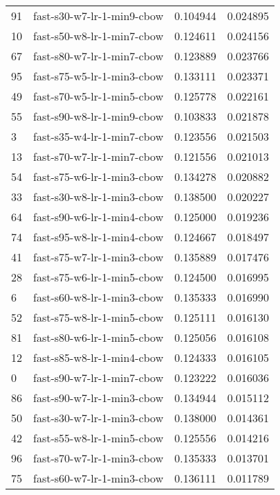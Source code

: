 {\begin{tabular}{llrr}
91 &   fast-s30-w7-lr-1-min9-cbow &  0.104944 &  0.024895 \\
10 &   fast-s50-w8-lr-1-min7-cbow &  0.124611 &  0.024156 \\
67 &   fast-s80-w7-lr-1-min7-cbow &  0.123889 &  0.023766 \\
95 &   fast-s75-w5-lr-1-min3-cbow &  0.133111 &  0.023371 \\
49 &   fast-s70-w5-lr-1-min5-cbow &  0.125778 &  0.022161 \\
55 &   fast-s90-w8-lr-1-min9-cbow &  0.103833 &  0.021878 \\
3  &   fast-s35-w4-lr-1-min7-cbow &  0.123556 &  0.021503 \\
13 &   fast-s70-w7-lr-1-min7-cbow &  0.121556 &  0.021013 \\
54 &   fast-s75-w6-lr-1-min3-cbow &  0.134278 &  0.020882 \\
33 &   fast-s30-w8-lr-1-min3-cbow &  0.138500 &  0.020227 \\
64 &   fast-s90-w6-lr-1-min4-cbow &  0.125000 &  0.019236 \\
74 &   fast-s95-w8-lr-1-min4-cbow &  0.124667 &  0.018497 \\
41 &   fast-s75-w7-lr-1-min3-cbow &  0.135889 &  0.017476 \\
28 &   fast-s75-w6-lr-1-min5-cbow &  0.124500 &  0.016995 \\
6  &   fast-s60-w8-lr-1-min3-cbow &  0.135333 &  0.016990 \\
52 &   fast-s75-w8-lr-1-min5-cbow &  0.125111 &  0.016130 \\
81 &   fast-s80-w6-lr-1-min5-cbow &  0.125056 &  0.016108 \\
12 &   fast-s85-w8-lr-1-min4-cbow &  0.124333 &  0.016105 \\
0  &   fast-s90-w7-lr-1-min7-cbow &  0.123222 &  0.016036 \\
86 &   fast-s90-w7-lr-1-min3-cbow &  0.134944 &  0.015112 \\
50 &   fast-s30-w7-lr-1-min3-cbow &  0.138000 &  0.014361 \\
42 &   fast-s55-w8-lr-1-min5-cbow &  0.125556 &  0.014216 \\
96 &   fast-s70-w7-lr-1-min3-cbow &  0.135333 &  0.013701 \\
75 &   fast-s60-w7-lr-1-min3-cbow &  0.136111 &  0.011789 \\
\bottomrule
\end{tabular}
}

